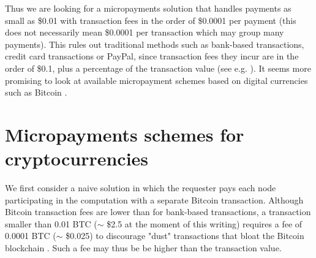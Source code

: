 \documentclass[a4paper]{article}
\newcommand{\BTC}{BTC}
\begin{document}
    Thus we are looking for a micropayments solution that handles payments as small as \$0.01 with transaction fees
    in the order of \$0.0001 per payment (this does not necessarily mean \$0.0001 per transaction which may group many
    payments). This rules out traditional methods such as bank-based transactions, credit card transactions or PayPal,
    since transaction fees they incur are in the order of \$0.1, plus a percentage of the transaction value
    (see e.g. \cite{FRS}).
    It seems more promising to look at available micropayment schemes based on digital currencies such
    as Bitcoin \cite{BITCOIN}.

\section{Micropayments schemes for cryptocurrencies}

    We first consider a naive solution in which the requester pays each node participating in the computation
    with a separate Bitcoin transaction. Although Bitcoin transaction fees are lower than for bank-based transactions,
    a transaction smaller than 0.01 \BTC{} ($\sim$ \$2.5 at the moment of this writing) requires a fee of
    0.0001 \BTC{} ($\sim$ \$0.025) to discourage "dust" transactions that bloat the Bitcoin blockchain \cite{BITFEE}.
    Such a fee may thus be be higher than the transaction value.
\end{document}
